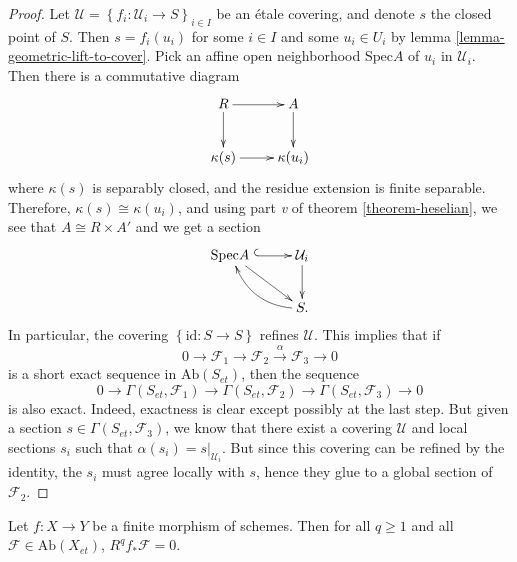 \begin{proof}
Let $\mathcal{U} = \left\{f_i : \mathcal{U}_i \to S \right\}_{i\in I}$ be an
\'etale covering, and denote $s$ the closed point of $S$. Then $s = f_i (u_i)$
for some $i\in I$ and some $u_i \in U_i$ by lemma
\ref{lemma-geometric-lift-to-cover}. Pick an affine open neighborhood
$\text{Spec} A$ of $u_i$ in $\mathcal{U}_i$. Then there is a commutative diagram
$$
\xymatrix{
R \ar[r] \ar[d] & A \ar[d] \\
{\kappa(s)} \ar[r] & {\kappa(u_i)}
}
$$
where $\kappa(s)$ is separably closed, and the residue extension is finite
separable. Therefore, $\kappa(s) \cong \kappa(u_i)$, and using part {\it v} of
theorem \ref{theorem-heselian}, we see that $A \cong R\times A'$ and we get a
section
$$
\xymatrix{
{\text{Spec} A\ }\ar[dr] \ar@{^{(}->}[r] & {\mathcal{U}_i} \ar[d]\\
& {S.} \ar@/^1pc/[ul]
}
$$
In particular, the covering $\left\{\text{id} : S\to S\right\}$ refines
$\mathcal{U}$. This implies that if
$$
0 \to \mathcal{F}_1\to \mathcal{F}_2 \xrightarrow{\alpha} \mathcal{F}_3\to 0
$$
is a short exact sequence in $\text{Ab}(S_{et})$, then the sequence
$$
0 \to \Gamma(S_{et}, \mathcal{F}_1) \to \Gamma(S_{et}, \mathcal{F}_2) \to
\Gamma(S_{et}, \mathcal{F}_3)\to 0
$$
is also exact. Indeed, exactness is clear except possibly at the last step. But
given a section $s \in \Gamma(S_{et}, \mathcal{F}_3)$, we know that there exist
a covering $\mathcal{U}$ and local sections $s_i$ such that $\alpha (s_i) =
s|_{\mathcal{U}_i}$. But since this covering can be refined by the identity,
the $s_i$ must agree locally with $s$, hence they glue to a global section of
$\mathcal{F}_2$.
\end{proof}

\begin{proposition}
\label{proposition-finite-higher-direct-image-zero}
Let $f: X\to Y$ be a finite morphism of schemes. Then for all $q\geq 1$ and all
$\mathcal{F}\in \text{Ab}(X_{et})$, $R^q f_*\mathcal{F}=0$.
\end{proposition}

